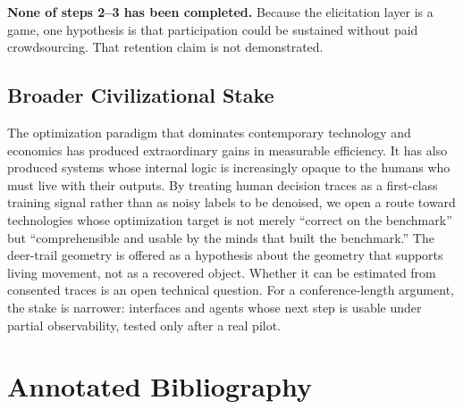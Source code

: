 \documentclass[11pt,a4paper]{report}
\begin{document}
\textbf{None of steps 2--3 has been completed.} Because the elicitation layer is a game, one hypothesis is that participation could be sustained without paid crowdsourcing. That retention claim is not demonstrated.

\section{Broader Civilizational Stake}

The optimization paradigm that dominates contemporary technology and economics has produced extraordinary gains in measurable efficiency. It has also produced systems whose internal logic is increasingly opaque to the humans who must live with their outputs. By treating human decision traces as a first-class training signal rather than as noisy labels to be denoised, we open a route toward technologies whose optimization target is not merely “correct on the benchmark” but “comprehensible and usable by the minds that built the benchmark.” The deer-trail geometry is offered as a hypothesis about the geometry that supports living movement, not as a recovered object. Whether it can be estimated from consented traces is an open technical question. For a conference-length argument, the stake is narrower: interfaces and agents whose next step is usable under partial observability, tested only after a real pilot.

\chapter*{Annotated Bibliography}
\end{document}
